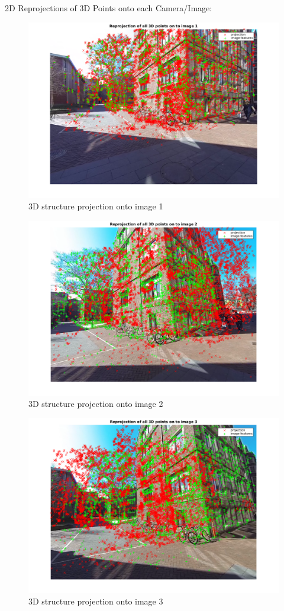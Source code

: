 \documentclass{article}
\begin{document}
2D Reprojections of 3D Points onto each Camera/Image:
\begin{figure}[!h]
\includegraphics[width = \textwidth]{f1.png}
\centering
\caption{3D structure projection onto image 1}
\end{figure}
\begin{figure}[!h]
\includegraphics[width = \textwidth]{f2.png}
\centering
\caption{3D structure projection onto image 2}
\end{figure}
\begin{figure}[!h]
\includegraphics[width = \textwidth]{f3.png}
\centering
\caption{3D structure projection onto image 3}
\end{figure}
\end{document}
